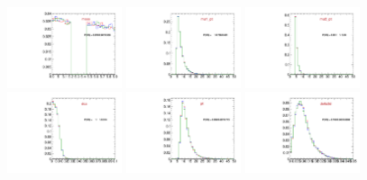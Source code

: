 \begin{figure}
  \includegraphics[width=0.3\textwidth]{Figures/VariablesComparison/Data_endcaps_figs_3h/mass}
  \includegraphics[width=0.3\textwidth]{Figures/VariablesComparison/Data_endcaps_figs_3h/mu1_pt}
  \includegraphics[width=0.3\textwidth]{Figures/VariablesComparison/Data_endcaps_figs_3h/mu2_pt}
  \includegraphics[width=0.3\textwidth]{Figures/VariablesComparison/Data_endcaps_figs_3h/dca}
  \includegraphics[width=0.3\textwidth]{Figures/VariablesComparison/Data_endcaps_figs_3h/pt}
  \includegraphics[width=0.3\textwidth]{Figures/VariablesComparison/Data_endcaps_figs_3h/delta3d}

\end{figure}
